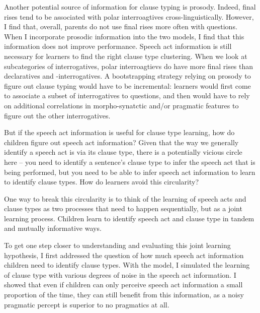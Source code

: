 Another potential source of information for clause typing is prosody. Indeed, final rises tend to be associated with polar interroagtives cross-linguistically. However, I find that, overall, parents do not use final rises more often with questions. When I incorporate prosodic information into the two models, I find that this information does not improve  performance. Speech act information is still necessary for learners to find the right clause type clustering. When we look at subcategories of interrogatives, polar interroagtievs do have more final rises than declaratives and \twh-interrogatives. A bootstrapping strategy relying on prosody to figure out clause typing would have to be incremental: learners would first come to associate a subset of interrogatives to questions, and then would have to rely on additional correlations in morpho-synatctic and/or pragmatic features to figure out the other interrogatives.

But if the speech act information is useful for clause type learning, how do children figure out speech act information? Given that the way we generally identify a speech act is via its clause type, there is a potentially vicious circle here -- you need to identify a sentence's clause type to infer the speech act that is being performed, but you need to be able to infer speech act information to learn to identify clause types. How do learners avoid this circularity?

One way to break this circularity is to  think of the learning of speech acts and clause types as two processes that need to happen sequentially, but as a joint learning process. Children learn to identify speech act and clause type in tandem and mutually informative ways.

To get one step closer to understanding and evaluating this joint learning hypothesis, I first addressed the question of how much speech act information children need to identify clause types. With the \plearnerabbr{} model, I simulated the learning of clause type with various degrees of noise in the speech act information. I showed that even if children can only perceive speech act information a small proportion of the time, they can still benefit from this information, as a noisy pragmatic percept is superior to no pragmatics at all. 



